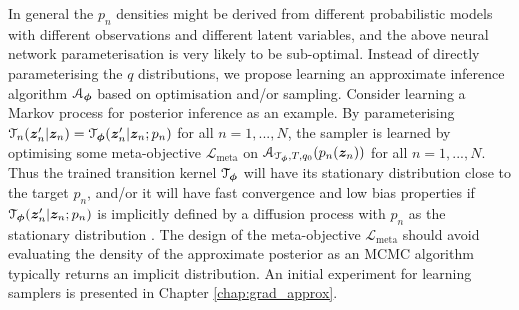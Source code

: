 In general the $p_n$ densities might be derived from different probabilistic models with different observations and different latent variables, and the above neural network parameterisation is very likely to be sub-optimal. Instead of directly parameterising the $q$ distributions, we propose learning an approximate inference algorithm $\mathcal{A}_{\bm{\phi}}$ based on optimisation and/or sampling. 
%
%
Consider learning a Markov process for posterior inference as an example. By parameterising $\mathcal{T}_n(\bm{z}'_n | \bm{z}_n) = \mathcal{T}_{\bm{\phi}}(\bm{z}'_n | \bm{z}_n; p_n)$ for all $n = 1, ..., N$, the sampler is learned by optimising some meta-objective $\mathcal{L}_{\text{meta}}$ on $\mathcal{A}_{\mathcal{T}_{\bm{\phi}}, T, q_0}(p_n(\bm{z}_n))$ for all $n = 1, ..., N$. 
%
Thus the trained transition kernel $\mathcal{T}_{\bm{\phi}}$ will have its stationary distribution close to the target $p_n$, and/or it will have fast convergence and low bias properties if $\mathcal{T}_{\bm{\phi}}(\bm{z}'_n | \bm{z}_n; p_n)$ is implicitly defined by a diffusion process with $p_n$ as the stationary distribution \citep{ma:mcmc_recipe2015}. The design of the meta-objective $\mathcal{L}_{\text{meta}}$ should avoid evaluating the density of the approximate posterior as an MCMC algorithm typically returns an implicit distribution. An initial experiment for learning samplers is presented in Chapter \ref{chap:grad_approx}.


